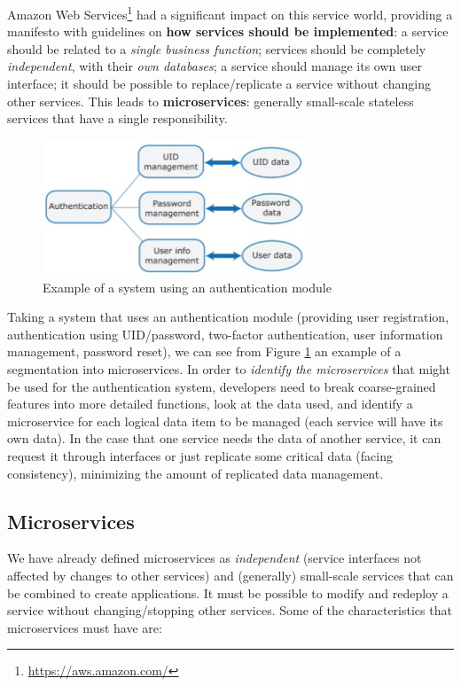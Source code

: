 Amazon Web Services\footnote{\url{https://aws.amazon.com/}} had a significant impact on this service world, providing a manifesto with guidelines on \textbf{how services should be implemented}: a service should be related to a \textit{single business function}; services should be completely \textit{independent}, with their \textit{own databases}; a service should manage its own user interface; it should be possible to replace/replicate a service without changing other services. This leads to \textbf{microservices}: generally small-scale stateless services that have a single responsibility.

\begin{figure} [H]
    \centering
    \includegraphics[width=0.7\textwidth]{images/Microservices/service_example.png}
    \caption{Example of a system using an authentication module}
    \label{fig:service_example}
\end{figure} 

Taking a system that uses an authentication module (providing user registration, authentication using UID/password, two-factor authentication, user information management, password reset), we can see from Figure \ref{fig:service_example} an example of a segmentation into microservices. In order to \textit{identify the microservices} that might be used for the authentication system, developers need to break coarse-grained features into more detailed functions, look at the data used, and identify a microservice for each logical data item to be managed (each service will have its own data). In the case that one service needs the data of another service, it can request it through interfaces or just replicate some critical data (facing consistency), minimizing the amount of replicated data management.

\subsection{Microservices}

We have already defined microservices as \textit{independent} (service interfaces not affected by changes to other services) and (generally) small-scale services that can be combined to create applications. It must be possible to modify and redeploy a service without changing/stopping other services.
\newline\noindent
Some of the characteristics that microservices must have are:

